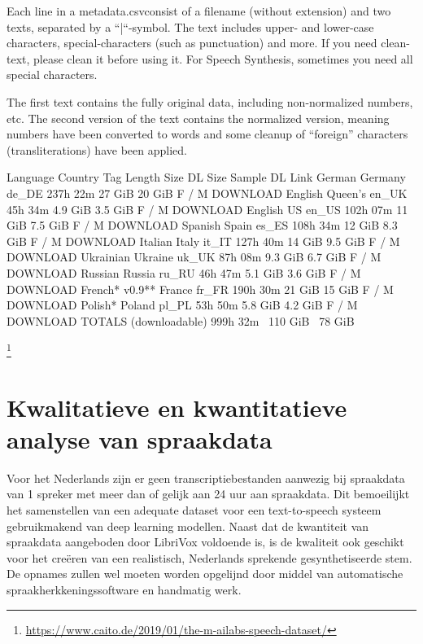 Each line in a metadata.csvconsist of a filename (without extension) and two texts, separated by a “|“-symbol. The text includes upper- and lower-case characters, special-characters (such as punctuation) and more. If you need clean-text, please clean it before using it. For Speech Synthesis, sometimes you need all special characters.

The first text contains the fully original data, including non-normalized numbers, etc. The second version of the text contains the normalized version, meaning numbers have been converted to words and some cleanup of “foreign” characters (transliterations) have been applied.


Language 	Country 	Tag 	Length 	Size 	DL Size 	Sample 	DL Link
German 	Germany 	de_DE 	237h 22m 	27 GiB 	20 GiB 	F / M 	DOWNLOAD
English 	Queen’s 	en_UK 	45h 34m 	4.9 GiB 	3.5 GiB 	F / M 	DOWNLOAD
English 	US 	en_US 	102h 07m 	11 GiB 	7.5 GiB 	F / M 	DOWNLOAD
Spanish 	Spain 	es_ES 	108h 34m 	12 GiB 	8.3 GiB 	F / M 	DOWNLOAD
Italian 	Italy 	it_IT 	127h 40m 	14 GiB 	9.5 GiB 	F / M 	DOWNLOAD
Ukrainian 	Ukraine 	uk_UK 	87h 08m 	9.3 GiB 	6.7 GiB 	F / M 	DOWNLOAD
Russian 	Russia 	ru_RU 	46h 47m 	5.1 GiB 	3.6 GiB 	F / M 	DOWNLOAD
French* v0.9** 	France 	fr_FR 	190h 30m 	21 GiB 	15 GiB 	F / M 	DOWNLOAD
Polish* 	Poland 	pl_PL 	53h 50m 	5.8 GiB 	4.2 GiB 	F / M 	DOWNLOAD
TOTALS (downloadable) 			999h 32m 	~110 GiB 	~78 GiB 	


\footnote{\url{https://www.caito.de/2019/01/the-m-ailabs-speech-dataset/}}

\section{Kwalitatieve en kwantitatieve analyse van spraakdata}

Voor het Nederlands zijn er geen transcriptiebestanden aanwezig bij spraakdata van 1 spreker met meer dan of gelijk aan 24 uur aan spraakdata. Dit bemoeilijkt het samenstellen van een adequate dataset voor een text-to-speech systeem gebruikmakend van deep learning modellen. Naast dat de kwantiteit van spraakdata aangeboden door LibriVox voldoende is, is de kwaliteit ook geschikt voor het creëren van een realistisch, Nederlands sprekende gesynthetiseerde stem. De opnames zullen wel moeten worden opgelijnd door middel van automatische spraakherkkeningssoftware en handmatig werk.

